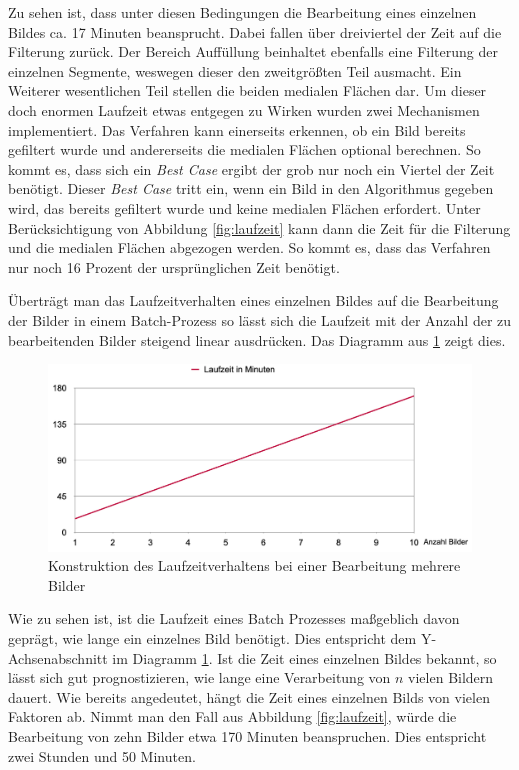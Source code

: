 Zu sehen ist, dass unter diesen Bedingungen die Bearbeitung eines einzelnen Bildes
ca. 17 Minuten beansprucht. Dabei fallen über dreiviertel der Zeit auf die Filterung
zurück. Der Bereich Auffüllung beinhaltet ebenfalls eine Filterung der einzelnen
Segmente, weswegen dieser den zweitgrößten Teil ausmacht. Ein Weiterer
wesentlichen Teil stellen die beiden medialen Flächen dar. Um dieser doch enormen
Laufzeit etwas entgegen zu Wirken wurden zwei Mechanismen implementiert. Das
Verfahren kann einerseits erkennen, ob ein Bild bereits gefiltert wurde und andererseits
die medialen Flächen optional berechnen. So kommt es, dass sich ein \textit{Best
Case} ergibt der grob nur noch ein Viertel der Zeit benötigt. Dieser \textit{Best
Case} tritt ein, wenn ein Bild in den Algorithmus gegeben wird, das bereits
gefiltert wurde und keine medialen Flächen erfordert. Unter Berücksichtigung von
Abbildung \ref{fig:laufzeit} kann dann die Zeit für die Filterung und die medialen
Flächen abgezogen werden. So kommt es, dass das Verfahren nur noch 16 Prozent der
ursprünglichen Zeit benötigt.

Überträgt man das Laufzeitverhalten eines einzelnen Bildes auf die Bearbeitung der
Bilder in einem Batch-Prozess so lässt sich die Laufzeit mit der Anzahl der zu bearbeitenden
Bilder steigend linear ausdrücken. Das Diagramm aus \ref{fig:laufzeit_batch}
zeigt dies.

\begin{figure}[h]
	\centering
	\includegraphics[width=1\textwidth]{img/runtimeBatch.png}
	\caption{Konstruktion des Laufzeitverhaltens bei einer Bearbeitung mehrere
	Bilder}
	\label{fig:laufzeit_batch}
\end{figure}

Wie zu sehen ist, ist die Laufzeit eines Batch Prozesses maßgeblich davon
geprägt, wie lange ein einzelnes Bild benötigt. Dies entspricht dem Y-Achsenabschnitt
im Diagramm \ref{fig:laufzeit_batch}. Ist die Zeit eines einzelnen Bildes bekannt,
so lässt sich gut prognostizieren, wie lange eine Verarbeitung von $n$ vielen Bildern
dauert. Wie bereits angedeutet, hängt die Zeit eines einzelnen Bilds von vielen Faktoren
ab. Nimmt man den Fall aus Abbildung \ref{fig:laufzeit}, würde die Bearbeitung von
zehn Bilder etwa 170 Minuten beanspruchen. Dies entspricht zwei Stunden und 50
Minuten.

